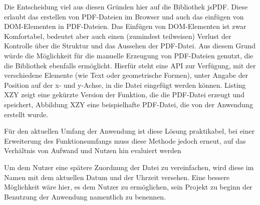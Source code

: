 
Die Entscheidung viel aus diesen Gründen hier auf die Bibliothek jsPDF\footnotemark{}. Diese erlaubt das erstellen von PDF-Dateien im Browser und auch das einfügen von DOM-Elementen in PDF-Dateien.
Das Einfügen von DOM-Elementen ist zwar Komfortabel, bedeutet aber auch einen (zumindest teilweisen) Verlust der Kontrolle über die Struktur und das Aussehen der PDF-Datei.
Aus diesem Grund würde die Möglichkeit für die manuelle Erzeugung von PDF-Dateien genutzt, die die Bibliothek ebenfalls ermöglicht. Hierfür steht eine API zur Verfügung, mit der verschiedene Elemente (wie Text oder geometrische Formen), unter Angabe der Position auf der x- und y-Achse, in die Datei eingefügt werden können. Listing XZY zeigt eine gekürzte Version der Funktion, die die PDF-Datei erzeugt und speichert, Abbildung XZY eine beispielhafte PDF-Datei, die von der Anwendung erstellt wurde.


Für den aktuellen Umfang der Anwendung ist diese Lösung praktikabel, bei einer Erweiterung des Funktionsumfangs muss diese Methode jedoch erneut, auf das Verhältnis von Aufwand und Nutzen hin evaluiert werden

Um dem Nutzer eine spätere Zuordnung der Datei zu vereinfachen, wird diese im Namen mit dem aktuellen Datum und der Uhrzeit versehen. Eine bessere Möglichkeit wäre hier, es dem Nutzer zu ermöglichen, sein Projekt zu beginn der Benutzung der Anwendung namentlich zu benennen.
